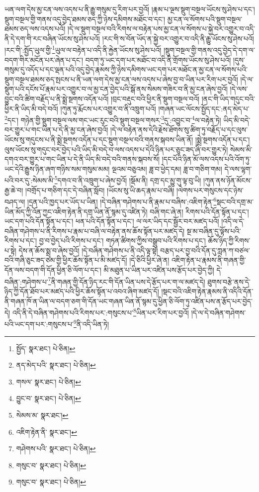 ཡན་ལག་དེས་མྱ་ངན་ལས་འདས་པ་ནི་རྒྱུ་གསུམ་དུ་རིག་པར་བྱའོ། །རྣམ་པ་ལྔས་སྡུག་བསྔལ་ཡོངས་སུ་ཤེས་པ་དང་། སྡུག་བསྔལ་གྱི་གནས་འདུ་བྱེད་ཐམས་ཅད་ཀྱི་ཉེས་དམིགས་མཐོང་བ་དང་། མྱ་ངན་ལ་སོགས་པའི་སྡུག་བསྔལ་ཐམས་ཅད་ལས་འདས་པའོ། །དེ་ལ་སྡུག་བསྔལ་བའི་རིགས་ལ་བརྟེན་པས་མྱ་ངན་ལ་སོགས་པ་སྐྱེ་བར་འགྱུར་བ་འདི་ནི་དེ་དག་གི་རང་བཞིན་ཡོངས་སུ་ཤེས་པའོ། །རང་གི་ས་བོན་ཡོད་ན་སྐྱེ་བར་འགྱུར་བ་འདི་ནི་རྒྱུ་ཡོངས་སུ་ཤེས་པའོ། །རང་གི་:སྤྱོད་ཡུལ་གྱི་\footnote{སྤྱོད་  སྣར་ཐང་།  པེ་ཅིན། }ཡུལ་ལ་བརྟེན་པ་འདི་ནི་རྐྱེན་ཡོངས་སུ་ཤེས་པའོ། །སྡུག་བསྔལ་གྱི་གནས་འདུ་བྱེད་དེ་དག་ལ་བདག་གིར་མངོན་པར་ཞེན་པ་དང་། བདག་ཏུ་ཡང་དག་པར་མཐོང་བ་འདི་ནི་གྲོགས་ཡོངས་སུ་ཤེས་པའོ། །དུས་གསུམ་དུ་འདོད་པ་དང་ལྡན་པའི་འདུ་བྱེད་རྣམས་ཀྱི་ཉེས་དམིགས་ཡང་དག་པར་མཐོང་ན་མྱ་ངན་ལ་སོགས་པའི་སྡུག་བསྔལ་ཐམས་ཅད་སྤངས་པ་ནི་ཡན་ལག་དེས་མྱ་ངན་ལས་འདས་པ་ཞེས་བྱ་བ་ཡིན་པར་རིག་པར་བྱའོ། །དེ་ལ་སྡུག་པའི་དངོས་པོ་རྣམ་པར་འགྱུར་བ་ལ་མྱ་ངན་བྱེད་པའི་སྒོ་ནས་སེམས་གཟིར་བ་ནི་མྱ་ངན་ཞེས་བྱའོ། །དེ་ལས་བྱུང་བའི་ཚིག་བརྗོད་པ་ནི་སྨྲེ་སྔགས་འདོན་པའོ། །བྲང་བརྡུང་བའི་ཕྱིར་ནི་སྡུག་བསྔལ་བའོ། །ནང་གི་ཡིད་གདུང་བའི་ཕྱིར་ནི་ཡིད་མི་བདེ་བའོ། །ཀུན་ཏུ་རྨོངས་པར་འགྱུར་བ་ནི་འཁྲུག་པའོ། །གཞན་ཡང་ལོངས་སྤྱོད་དང་:ནད་མེད་པ་\footnote{ནད་མེད་པའི་  སྣར་ཐང་།  པེ་ཅིན། }དང་། གཉེན་གྱི་སྡུག་བསྔལ་ལས་གང་ཡང་རུང་བའི་སྡུག་བསྔལ་གསར་\footnote{གསལ་  སྣར་ཐང་།  པེ་ཅིན། }དུ་:འབྱུང་བ་\footnote{བྱུང་བ་  སྣར་ཐང་།  པེ་ཅིན། }ལ་བརྟེན་ཏེ། ཡིད་མི་བདེ་བར་གྱུར་པ་གང་ཡིན་པ་དེ་ནི་མྱ་ངན་ཞེས་བྱའོ། །དེ་ལ་བརྟེན་ནས་དེའི་རྗེས་ཐོགས་སུ་ཚིག་ཏུ་བརྗོད་པ་དང་ལུས་ཡོངས་སུ་གདུངས་པ་ནི་སྨྲེ་སྔགས་འདོན་པ་དང་སྡུག་བསྔལ་བའི་གནས་སྐབས་ཡིན་ནོ། །སྨྲེ་སྔགས་འདོན་པ་དང་། ལུས་ཡོངས་སུ་གདུང་བར་བྱེད་པའི་ཡིད་མི་བདེ་བ་ལས་འདས་པ་དེའི་ཉིན་པར་ཅུང་ཟད་ཞི་བར་གྱུར་ཏེ། སེམས་མི་དགའ་བར་གྱུར་པ་གང་ཡིན་པ་དེ་ནི་ཡིད་མི་བདེ་བའི་གནས་སྐབས་སོ། །དང་པོའི་ཉིན་མོ་ལས་འདས་པའི་འོག་ཏུ་ཡང་དེའི་རྒྱུས་ཉིན་ཞག་གཉིས་སམ་གསུམ་མམ། ལྔའམ་བཅུའམ། ཟླ་བ་ཕྱེད་དམ། ཟླ་བ་གཅིག་གམ། དེ་ལས་ལྷག་པའི་བར་དུ་:སེམས་མི་\footnote{སེམས་མ་  སྣར་ཐང་། }དགའ་བ་ནི་འཁྲུག་པ་ཞེས་བྱའོ། །སྡོམ་ནི། དགྲ་དང་མྱུ་གུ་ལྟ་བུ་ཡི། །ཀུན་ནས་ཉོན་མོངས་རྒྱ་ཆེ་བ། །བགྲོད་པ་གཅིག་དང་དེ་བཞིན་སློབ། །ཡོངས་སུ་ཡི་ཆད་རྣམ་པ་བཞི། །ལེགས་པར་གསུངས་དང་ཉེས་བཤད་ལ། །དྲན་པའི་ཁྱད་པར་ཡོད་པ་ཡིན། །དེ་བཞིན་གཤེགས་པ་ནི་རྣམ་པ་བཞིས་:འཇིག་རྟེན་\footnote{འཇིག་རྟེན་ནི་  སྣར་ཐང་། }སྡང་བའི་དགྲ་མ་ཡིན་མོད་ཀྱི་འོན་ཀྱང་འཇིག་རྟེན་ནི་དགྲ་ཡིན་ནོ་སྙམ་དུ་འཛིན་ཏེ། བཞི་གང་ཞེ་ན། རིགས་པའི་དོན་སྟོན་པ་དང་། ཡང་དག་པའི་དོན་སྟོན་པ་དང་། ཕན་པའི་དོན་སྟོན་པ་དང་། ལ་ལར་ཡིད་དང་སྦྱོར་བར་མཛད་པའོ། །འདི་ལ་དེ་བཞིན་གཤེགས་པ་ནི་རིགས་པ་རྣམ་པ་བཞི་ལ་བརྟེན་ནས་ཆོས་སྟོན་པར་མཛད་དེ། སྔ་མ་བཞིན་དུ་ལྟོས་པའི་རིགས་པ་དང་། བྱ་བ་བྱེད་པའི་རིགས་པ་དང་། གཏན་ཚིགས་ཀྱིས་བསྒྲུབ་པའི་རིགས་པ་དང་། ཆོས་ཉིད་ཀྱི་རིགས་པ་སྟེ། དེས་ན་ཆོས་སྨྲ་བ་ཞེས་བྱའོ། །དེ་བཞིན་གཤེགས་པ་ནི་འདི་ལྟ་སྟེ། བརྩད་པར་བྱ་བའི་དོན་དུ་ཀླན་ཀ་བཙལ་བའི་གཞི་ཅུང་ཟད་ཙམ་གྱི་ཕྱིར་ཆོས་སྟོན་པ་མི་མཛད་དོ། །དེ་ཅིའི་ཕྱིར་ཞེ་ན། འཇིག་རྟེན་པ་རྣམས་ནི་གཞན་གྱི་དོན་ལས་བདག་གི་དོན་ཕྱིན་ཅི་ལོག་པ་དང་། མི་མཐུན་པ་ཡིན་པར་འཛིན་པས་རྩོད་པར་བྱེད་ཀྱི། དེ་བཞིན་:གཤེགས་པ་\footnote{གཤེགས་པའི་  སྣར་ཐང་།  པེ་ཅིན། }ནི་གཞན་གྱི་དོན་ཉིད་རང་གི་དོན་ཡིན་པས་དེ་རྩོད་པར་ག་ལ་མཛད་དེ། ཐུགས་བརྩེ་ནས་དེ་ཉིད་ཀྱི་དོན་ཐོབ་པར་མཛད་པའི་ཕྱིར་ཆོས་སྟོན་པ་འབའ་ཞིག་མཛད་དོ། །སྡང་བའི་འཇིག་རྟེན་རྣམས་ནི་འདིའི་དོན་ནི་གཞན་ཁོ་ན་ཡིན་ལ་བདག་ཅག་གི་དོན་ཡང་གཞན་ཡིན་ནོ་སྙམ་དུ་ཕྱིན་ཅི་ལོག་ཏུ་འཛིན་པས་ན་རྩོད་པར་བྱེད་དེ། འདི་ནི་དེ་བཞིན་གཤེགས་པའི་རིགས་པར་:གསུངས་པ་\footnote{གསུང་བ་  སྣར་ཐང་།  པེ་ཅིན། }ཡིན་པར་རིག་པར་བྱའོ། །དེ་ལ་དེ་བཞིན་གཤེགས་པའི་ཡང་དག་པར་:གསུངས་པ་\footnote{གསུང་བ་  སྣར་ཐང་།  པེ་ཅིན། }ནི་འདི་ཡིན་ཏེ། 